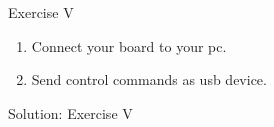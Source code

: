 \begin{frame}
    \begin{exampleblock}{Exercise V}
        \begin{enumerate}
            \item Connect your board to your \acs{pc}.
            \item Send control commands as \acs{usb} device.
        \end{enumerate}
    \end{exampleblock}
\end{frame}

\begin{frame}{Solution: Exercise V}
\end{frame}